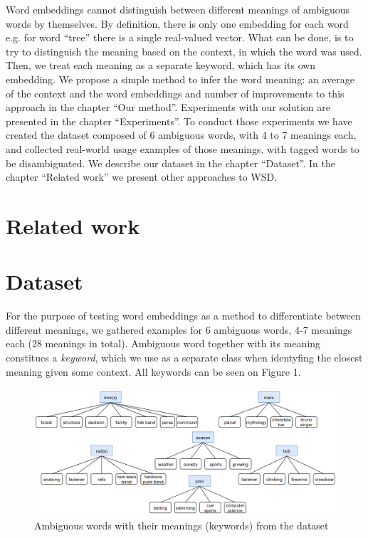 \documentclass{llncs}
\begin{document}
Word embeddings cannot distinguish between different meanings of ambiguous words by themselves. By definition, there is only one embedding for each word e.g. for word ``tree'' there is a single real-valued vector. What can be done, is to try to distinguish the meaning based on the context, in which the word was used. Then, we treat each meaning as a separate keyword, which has its own embedding.
We propose a simple method to infer the word meaning: an average of the context and the word embeddings and number of improvements to this approach in the chapter ``Our method''. Experiments with our solution are presented in the chapter ``Experiments''. To conduct those experiments we have created the dataset composed of 6 ambiguous words, with 4 to 7 meanings each, and collected real-world usage examples of those meanings, with tagged words to be disambiguated. We describe our dataset in the chapter ``Dataset''. In the chapter ``Related work'' we present other approaches to WSD.

\section{Related work}
\label{related work}

\section{Dataset}
\label{dataset}
For the purpose of testing word embeddings as a method to differentiate between different meanings, we gathered examples for 6 ambiguous words, 4-7 meanings each (28 meanings in total).
Ambiguous word together with its meaning constitues a \textit{keyword}, which we use as a separate class when identyfing the closest meaning given some context.
All keywords can be seen on Figure 1.

\begin{figure}
    \label{fig:keywords}
    \caption{Ambiguous words with their meanings (keywords) from the dataset}
    \includegraphics[scale=0.35]{res/keywords.png}
\end{figure}
\end{document}
